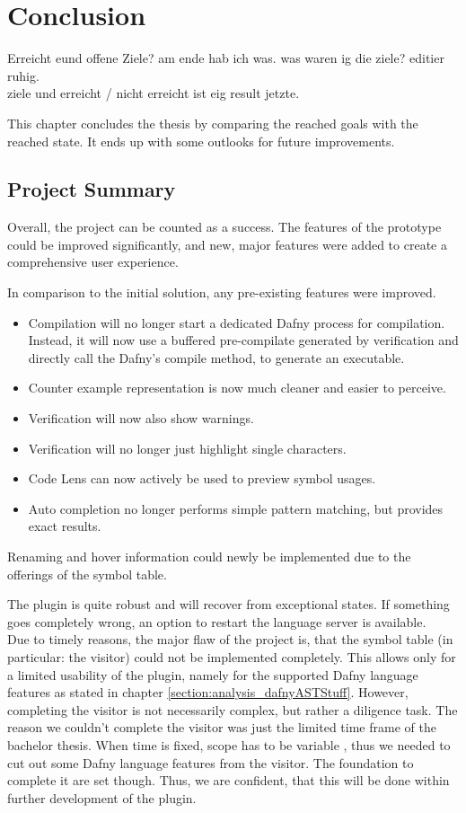 \section{Conclusion}
\label{section:conclusion}
Erreicht eund offene Ziele? am ende hab ich was. was waren ig die ziele? editier ruhig. \\
ziele und erreicht / nicht erreicht ist eig result jetzte.


This chapter concludes the thesis by comparing the reached goals with the reached state.
It ends up with some outlooks for future improvements.

\subsection{Project Summary}
Overall, the project can be counted as a success.
The features of the prototype could be improved significantly, and new, major features were added to create a comprehensive user experience.

In comparison to the initial solution, any pre-existing features were improved.
\begin{itemize}
 \item Compilation will no longer start a dedicated Dafny process for compilation. Instead, it will now use a buffered pre-compilate generated by verification and directly call the Dafny's compile method, to generate an executable.
 \item Counter example representation is now much cleaner and easier to perceive.
 \item Verification will now also show warnings.
 \item Verification will no longer just highlight single characters.
 \item Code Lens can now actively be used to preview symbol usages.
 \item Auto completion no longer performs simple pattern matching, but provides exact results.
\end{itemize}
Renaming and hover information could newly be implemented due to the offerings of the symbol table.

The plugin is quite robust and will recover from exceptional states.
If something goes completely wrong, an option to restart the language server is available.\\

Due to timely reasons, the major flaw of the project is, that the symbol table (in particular: the visitor) could not be implemented completely.
This allows only for a limited usability of the plugin, namely for the supported Dafny language features as stated in chapter \ref{section:analysis_dafnyASTStuff}.
However, completing the visitor is not necessarily complex, but rather a diligence task.
The reason we couldn't complete the visitor was just the limited time frame of the bachelor thesis.
When time is fixed, scope has to be variable \cite{keller}, thus we needed to cut out some Dafny language features from the visitor.
The foundation to complete it are set though.
Thus, we are confident, that this will be done within further development of the plugin.\\

